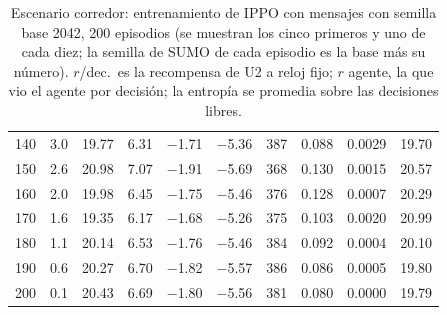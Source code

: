 \begin{table}[H]
\begin{tabular}{rrrrrrrrrr}
140 & 3.0 & 19.77 & 6.31 & $-$1.71 & $-$5.36 & 387 & 0.088 & 0.0029 & 19.70 \\
150 & 2.6 & 20.98 & 7.07 & $-$1.91 & $-$5.69 & 368 & 0.130 & 0.0015 & 20.57 \\
160 & 2.0 & 19.98 & 6.45 & $-$1.75 & $-$5.46 & 376 & 0.128 & 0.0007 & 20.29 \\
170 & 1.6 & 19.35 & 6.17 & $-$1.68 & $-$5.26 & 375 & 0.103 & 0.0020 & 20.99 \\
180 & 1.1 & 20.14 & 6.53 & $-$1.76 & $-$5.46 & 384 & 0.092 & 0.0004 & 20.10 \\
190 & 0.6 & 20.27 & 6.70 & $-$1.82 & $-$5.57 & 386 & 0.086 & 0.0005 & 19.80 \\
200 & 0.1 & 20.43 & 6.69 & $-$1.80 & $-$5.56 & 381 & 0.080 & 0.0000 & 19.79 \\
\bottomrule
\end{tabular}
\caption[Escenario corredor: entrenamiento de IPPO con mensajes, semilla base 2042]{Escenario corredor: entrenamiento de IPPO con mensajes con semilla base 2042, 200 episodios (se muestran los cinco primeros y uno de cada diez; la semilla de SUMO de cada episodio es la base más su número). $r$/dec.\ es la recompensa de U2 a reloj fijo; $r$ agente, la que vio el agente por decisión; la entropía se promedia sobre las decisiones libres.}
\label{tab:corredor-ippo-vecinos-2042}
\end{table}


